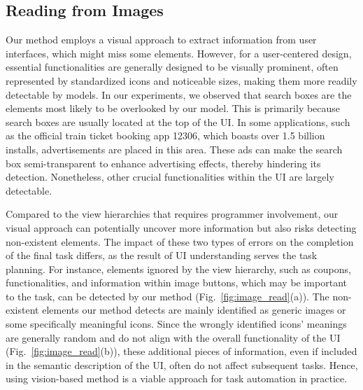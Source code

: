 \subsection{Reading from Images}

Our method employs a visual approach to extract information from user interfaces, which might miss some elements. However, for a user-centered design, essential functionalities are generally designed to be visually prominent, often represented by standardized icons and noticeable sizes, making them more readily detectable by models. In our experiments, we observed that search boxes are the elements most likely to be overlooked by our model. This is primarily because search boxes are usually located at the top of the UI. In some applications, such as the official train ticket booking app 12306, which boasts over 1.5 billion installs, advertisements are placed in this area. These ads can make the search box semi-transparent to enhance advertising effects, thereby hindering its detection. Nonetheless, other crucial functionalities within the UI are largely detectable.

Compared to the view hierarchies that requires programmer involvement, our visual approach can potentially uncover more information but also risks detecting non-existent elements. The impact of these two types of errors on the completion of the final task differs, as the result of UI understanding serves the task planning. For instance, elements ignored by the view hierarchy, such as coupons, functionalities, and information within image buttons, which may be important to the task, can be detected by our method (Fig.~\ref{fig:image_read}(a)). The non-existent elements our method detects are mainly identified as generic images or some specifically meaningful icons. Since the wrongly identified icons' meanings are generally random and do not align with the overall functionality of the UI (Fig.~\ref{fig:image_read}(b)), these additional pieces of information, even if included in the semantic description of the UI, often do not affect subsequent tasks. Hence, using vision-based method is a viable approach for task automation in practice.

